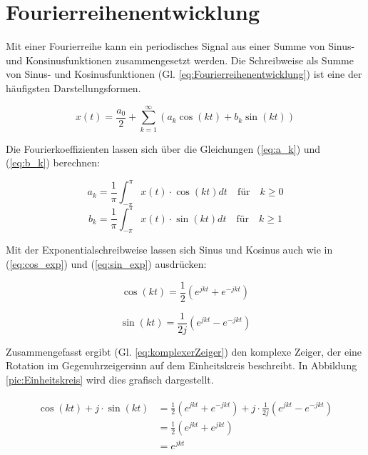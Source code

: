 \section{Fourierreihenentwicklung}
Mit einer Fourierreihe kann ein periodisches Signal aus einer Summe von Sinus- und Konsinusfunktionen
zusammengesetzt werden. Die Schreibweise als Summe von Sinus- und Kosinusfunktionen (Gl. \ref{eq:Fourierreihenentwicklung}) ist eine 
der häufigsten Darstellungsformen.

\begin{equation}\label{eq:Fourierreihenentwicklung}
 x(t) = \frac{a_0}{2} + \sum_{k=1}^\infty \left(a_k \cos(kt) + b_k \sin(kt)\right)
\end{equation}

Die Fourierkoeffizienten lassen sich über die Gleichungen (\ref{eq:a_k}) und (\ref{eq:b_k}) berechnen:

\begin{equation}\label{eq:a_k}
 a_k = \frac{1}{\pi} \int_{-\pi}^{\pi} x(t) \cdot \cos(kt) dt \quad \textrm{für} \quad k \geq 0 
\end{equation}
\begin{equation}\label{eq:b_k}
 b_k = \frac{1}{\pi} \int_{-\pi}^{\pi} x(t) \cdot \sin(kt) dt \quad \textrm{für} \quad k \geq 1
\end{equation}

Mit der Exponentialschreibweise lassen sich Sinus und Kosinus auch wie in (\ref{eq:cos_exp}) und (\ref{eq:sin_exp}) ausdrücken:

\begin{equation}\label{eq:cos_exp}
 \cos(k t) = \frac{1}{2}\left(e^{j k t} + e^{-j k t} \right)
\end{equation}

\begin{equation}\label{eq:sin_exp}
 \sin(k t) = \frac{1}{2j}\left(e^{j k t} - e^{-j k t} \right)
\end{equation}

Zusammengefasst ergibt (Gl. \ref{eq:komplexerZeiger}) den komplexe Zeiger, der eine Rotation im Gegenuhrzeigersinn auf dem Einheitskreis beschreibt.
In Abbildung \ref{pic:Einheitskreis} wird dies grafisch dargestellt.

 \begin{align}
\begin{split}\label{eq:komplexerZeiger}
\cos(k t) +j\cdot \sin(k t) &= \frac{1}{2}\left(e^{j k t} + e^{-j k t} \right)+j\cdot \frac{1}{2j}\left(e^{j k t} - e^{-j k t} \right)\\
&= \frac{1}{2} \left(e^{j k t} + e^{j k t}\right)\\
&= e^{j k t}\\
\end{split}
\end{align}


